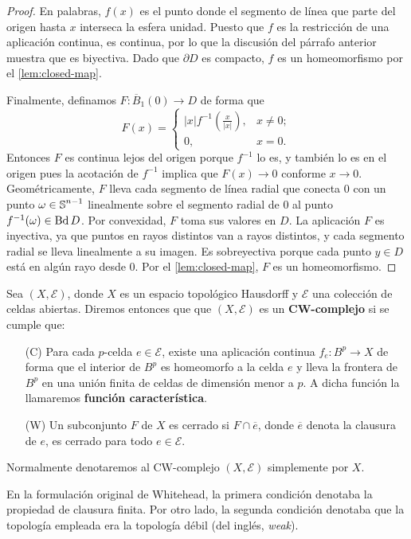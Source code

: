 \begin{proof}
	En palabras, $f(x)$ es el punto donde el segmento de línea que parte del
	origen hasta $x$ interseca la esfera unidad. Puesto que $f$ es la restricción de
	una aplicación continua, es continua, por lo que la discusión del párrafo anterior
	muestra que es biyectiva. Dado que $\partial D$ es compacto, $f$ es un homeomorfismo
	por el \autoref{lem:closed-map}.
	
	Finalmente, definamos $F : \overline{B}_{1}(0) \to D$ de forma que
	\[
	F(x) =
	\begin{cases}
		|x| f^{-1}\left( \frac{x}{|x|}\right), & x \neq 0; \\
		0,                                     & x = 0.
	\end{cases}
	\]
	Entonces $F$ es continua lejos del origen porque $f^{-1}$ lo es, y también lo es
	en el origen pues la acotación de $f^{-1}$ implica que $F(x) \to 0$ conforme $x
	\to 0$. Geométricamente, $F$ lleva cada segmento de línea radial que conecta $0$
	con un punto $\omega \in \operatorname{\mathbb{S}}^{n-1}$ linealmente sobre el segmento radial de
	$0$ al punto $f^{-1}(\omega) \in \operatorname{Bd} D$. Por convexidad, $F$ toma sus valores en
	$D$. La aplicación $F$ es inyectiva, ya que puntos en rayos distintos van a rayos
	distintos, y cada segmento radial se lleva linealmente a su imagen. Es sobreyectiva
	porque cada punto $y \in D$ está en algún rayo desde $0$. Por el
	\autoref{lem:closed-map}, $F$ es un homeomorfismo.
\end{proof}

\begin{definicion}
	Sea $(X,\mathcal{E})$, donde $X$ es un espacio topológico Hausdorff y
	$\mathcal{E}$ una colección de celdas abiertas. Diremos entonces que que $(X,\mathcal{E}
	)$ es un \textbf{CW-complejo} si se cumple que:
	\begin{enumerate}[font=\bfseries]
		\item[(C)] Para cada $p$-celda $e \in \mathcal{E}$, existe una aplicación
		continua $f_{e} : B^{p} \to X$ de forma que el interior de $B^{p}$ es
		homeomorfo a la celda $e$ y lleva la frontera de $B^{p}$ en una unión
		finita de celdas de dimensión menor a $p$. A dicha función la llamaremos \textbf{función
			característica}.
		
		\item[(W)] Un subconjunto $F$ de $X$ es cerrado si $F \cap \overline{e}$,
		donde $\overline{e}$ denota la clausura de $e$, es cerrado para todo $e \in
		\mathcal{E}$.
	\end{enumerate}
	Normalmente denotaremos al CW-complejo $(X,\mathcal{E})$ simplemente por $X$.
\end{definicion}
\begin{observacion}
	En la formulación original de Whitehead, la primera condición denotaba la
	propiedad de clausura finita. Por otro lado, la segunda condición denotaba que
	la topología empleada era la topología débil (del inglés, \textit{weak}).%
\end{observacion}

